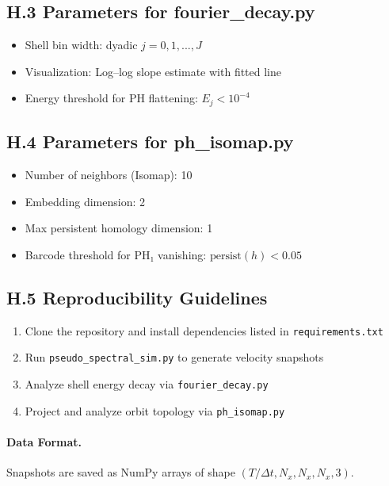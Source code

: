 \documentclass[11pt]{article}
\theoremstyle{definition}
\begin{document}
\subsection*{H.3 Parameters for fourier\_decay.py}

\begin{itemize}
  \item Shell bin width: dyadic \( j = 0,1,...,J \)
  \item Visualization: Log–log slope estimate with fitted line
  \item Energy threshold for PH flattening: \( E_j < 10^{-4} \)
\end{itemize}

\subsection*{H.4 Parameters for ph\_isomap.py}

\begin{itemize}
  \item Number of neighbors (Isomap): 10
  \item Embedding dimension: 2
  \item Max persistent homology dimension: 1
  \item Barcode threshold for PH₁ vanishing: \( \mathrm{persist}(h) < 0.05 \)
\end{itemize}

\subsection*{H.5 Reproducibility Guidelines}

\begin{enumerate}
  \item Clone the repository and install dependencies listed in \texttt{requirements.txt}
  \item Run \texttt{pseudo\_spectral\_sim.py} to generate velocity snapshots
  \item Analyze shell energy decay via \texttt{fourier\_decay.py}
  \item Project and analyze orbit topology via \texttt{ph\_isomap.py}
\end{enumerate}

\paragraph{Data Format.} Snapshots are saved as NumPy arrays of shape \( (T/\Delta t, N_x, N_x, N_x, 3) \).
\end{document}
